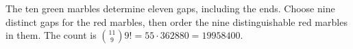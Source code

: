 The ten green marbles determine eleven gaps, including the ends. Choose nine distinct gaps for the red marbles, then order the nine distinguishable red marbles in them. The count is $\binom{11}{9}9!=55\cdot362880=\boxed{19958400}$.
